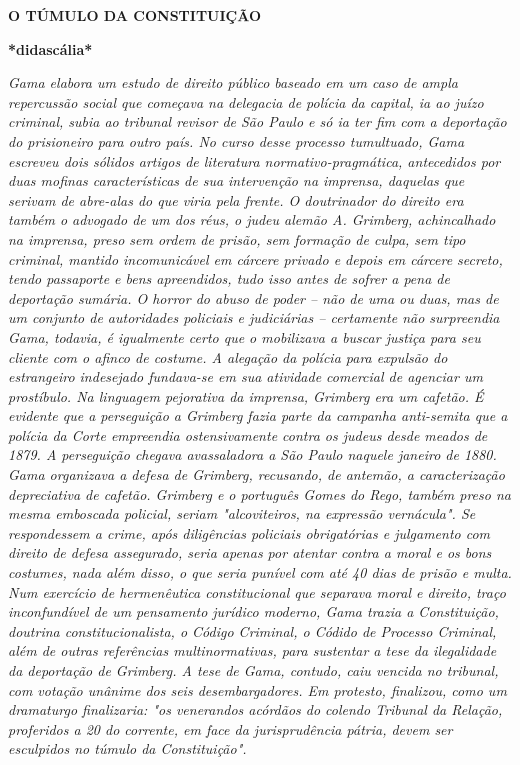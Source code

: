\textbf{O TÚMULO DA
CONSTITUIÇÃO}

\textbf{*didascália*}

\emph{Gama elabora um estudo de direito público baseado em um caso de
ampla repercussão social que começava na delegacia de polícia da
capital, ia ao juízo criminal, subia ao tribunal revisor de São Paulo e
só ia ter fim com a deportação do prisioneiro para outro país. No curso
desse processo tumultuado, Gama escreveu dois sólidos artigos de
literatura normativo-pragmática, antecedidos por duas mofinas
características de sua intervenção na imprensa, daquelas que serivam de
abre-alas do que viria pela frente. O doutrinador do direito era também
o advogado de um dos réus, o judeu alemão A. Grimberg, achincalhado na
imprensa, preso sem ordem de prisão, sem formação de culpa, sem tipo
criminal, mantido incomunicável em cárcere privado e depois em cárcere
secreto, tendo passaporte e bens apreendidos, tudo isso antes de sofrer
a pena de deportação sumária. O horror do abuso de poder -- não de uma
ou duas, mas de um conjunto de autoridades policiais e judiciárias --
certamente não surpreendia Gama, todavia, é igualmente certo que o
mobilizava a buscar justiça para seu cliente com o afinco de costume. A
alegação da polícia para expulsão do estrangeiro indesejado fundava-se
em sua atividade comercial de agenciar um prostíbulo. Na linguagem
pejorativa da imprensa, Grimberg era um cafetão. É evidente que a
perseguição a Grimberg fazia parte da campanha anti-semita que a polícia
da Corte empreendia ostensivamente contra os judeus desde meados de
1879. A perseguição chegava avassaladora a São Paulo naquele janeiro de
1880. Gama organizava a defesa de Grimberg, recusando, de antemão, a
caracterização depreciativa de cafetão. Grimberg e o português Gomes do
Rego, também preso na mesma emboscada policial, seriam "alcoviteiros, na
expressão vernácula". Se respondessem a crime, após diligências
policiais obrigatórias e julgamento com direito de defesa assegurado,
seria apenas por atentar contra a moral e os bons costumes, nada além
disso, o que seria punível com até 40 dias de prisão e multa. Num
exercício de hermenêutica constitucional que separava moral e direito,
traço inconfundível de um pensamento jurídico moderno, Gama trazia a
Constituição, doutrina constitucionalista, o Código Criminal, o Códido
de Processo Criminal, além de outras referências multinormativas, para
sustentar a tese da ilegalidade da deportação de Grimberg. A tese de
Gama, contudo, caiu vencida no tribunal, com votação unânime dos seis
desembargadores. Em protesto, finalizou, como um dramaturgo finalizaria:
"os venerandos acórdãos do colendo Tribunal da Relação, proferidos a 20
do corrente, em face da jurisprudência pátria, devem ser esculpidos no
túmulo da Constituição". }

